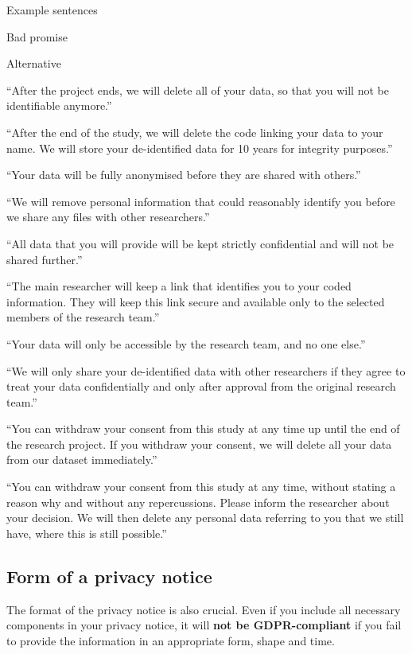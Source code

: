 \documentclass[
]{book}
\begin{document}
Example sentences

Bad promise

Alternative

``After the project ends, we will delete all of your data, so that you will not be identifiable anymore.''

``After the end of the study, we will delete the code linking your data to your name. We will store your de-identified data for 10 years for integrity purposes.''

``Your data will be fully anonymised before they are shared with others.''

``We will remove personal information that could reasonably identify you before we share any files with other researchers.''

``All data that you will provide will be kept strictly confidential and will not be shared further.''

``The main researcher will keep a link that identifies you to your coded information. They will keep this link secure and available only to the selected members of the research team.''

``Your data will only be accessible by the research team, and no one else.''

``We will only share your de-identified data with other researchers if they agree to treat your data confidentially and only after approval from the original research team.''

``You can withdraw your consent from this study at any time up until the end of the research project. If you withdraw your consent, we will delete all your data from our dataset immediately.''

``You can withdraw your consent from this study at any time, without stating a reason why and without any repercussions. Please inform the researcher about your decision. We will then delete any personal data referring to you that we still have, where this is still possible.''

\hypertarget{form-of-a-privacy-notice}{%
\subsection{Form of a privacy notice}\label{form-of-a-privacy-notice}}

The format of the privacy notice is also crucial. Even if you include all
necessary components in your privacy notice, it will \textbf{not be GDPR-compliant}
if you fail to provide the information in an appropriate form, shape and time.
\end{document}
